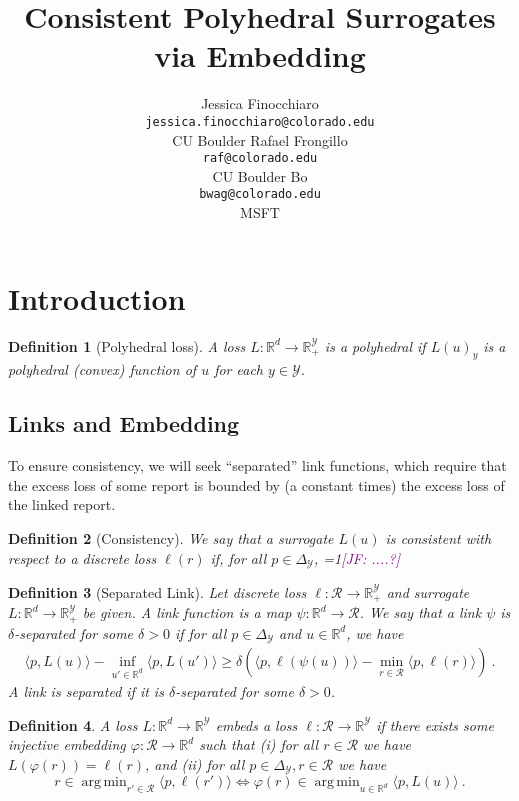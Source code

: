 \documentclass[12pt]{article}
\title{Consistent Polyhedral Surrogates via Embedding}
\author{%
 Jessica Finocchiaro\raf{Jessie?} \\
 \texttt{jessica.finocchiaro@colorado.edu}\\
 CU Boulder
 \And
 Rafael Frongillo\\
 \texttt{raf@colorado.edu}\\
 CU Boulder
 \And
 Bo\\
 \texttt{bwag@colorado.edu}\\
 MSFT
}
\newcommand{\Comments}{1}
\newcommand{\mynote}[2]{\ifnum\Comments=1\textcolor{#1}{#2}\fi}
\newcommand{\jessie}[1]{\mynote{purple}{[JF: #1]}}
\newcommand{\reals}{\mathbb{R}}
\newcommand{\simplex}{\Delta_\Y}
\newcommand{\R}{\mathcal{R}}
\newcommand{\Y}{\mathcal{Y}}
\newcommand{\inprod}[2]{\langle #1, #2 \rangle}%
\DeclareMathOperator*{\argmin}{arg\,min}
\newtheorem{definition}{Definition}
\begin{document}
\maketitle

\section{Introduction}\label{sec:intro}



%
\begin{definition}[Polyhedral loss]
  A loss $L: \reals^d \to \reals^{\Y}_+$ is a \emph{polyhedral} if $L(u)_y$ is a polyhedral (convex) function of $u$ for each $y\in\Y$.
\end{definition}

\subsection{Links and Embedding}

To ensure consistency, we will seek ``separated'' link functions, which require that the excess loss of some report is bounded by (a constant times) the excess loss of the linked report.

\begin{definition}[Consistency]\label{def:consistency}
We say that a surrogate $L(u)$ is \emph{consistent} with respect to a discrete loss $\ell(r)$ if, for all $p \in \simplex$, \jessie{....?}
\end{definition}

\begin{definition}[Separated Link]\label{def:links}
  Let discrete loss $\ell:\R\to\reals^\Y_+$ and surrogate $L:\reals^d\to\reals^\Y_+$ be given.
  A \emph{link function} is a map $\psi:\reals^d\to\R$.
  We say that a link $\psi$ is \emph{$\delta$-separated} for some $\delta > 0$ if for all $p \in \simplex$ and $u\in\reals^d$, we have
  \begin{align*}
    \inprod{p}{L(u)} - \inf_{u' \in \reals^d} \inprod{p}{L(u')} \geq \delta\left(\inprod{p}{\ell(\psi(u))} - \min_{r \in \R} \inprod{p}{\ell(r)}\right)~.
  \end{align*}
  A link is \emph{separated} if it is $\delta$-separated for some $\delta>0$.
\end{definition}

\begin{definition}\label{def:loss-embed}
  A loss $L:\reals^d\to\reals^\Y$ \emph{embeds} a loss $\ell:\R\to\reals^\Y$ if there exists some injective embedding $\varphi:\R\to\reals^d$ such that
  (i) for all $r\in\R$ we have $L(\varphi(r)) = \ell(r)$, and (ii) for all $p\in\simplex,r\in\R$ we have
  \begin{equation}\label{eq:embed-loss}
    r \in \argmin_{r'\in\R} \inprod{p}{\ell(r')} \iff \varphi(r) \in \argmin_{u\in\reals^d} \inprod{p}{L(u)}~.
  \end{equation}
\end{definition}
\end{document}

